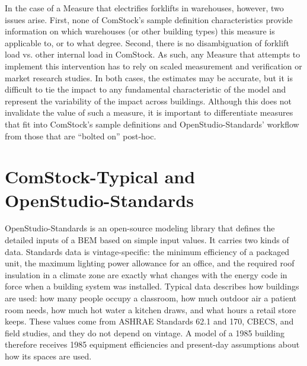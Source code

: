 In the case of a Measure that electrifies forklifts in warehouses, however, two issues arise. First, none of ComStock's sample definition characteristics provide information on which warehouses (or other building types) this measure is applicable to, or to what degree. Second, there is no disambiguation of forklift load vs. other internal load in ComStock. As such, any Measure that attempts to implement this intervention has to rely on scaled measurement and verification or market research studies. In both cases, the estimates may be accurate, but it is difficult to tie the impact to any fundamental characteristic of the model and represent the variability of the impact across buildings. Although this does not invalidate the value of such a measure, it is important to differentiate measures that fit into ComStock's sample definitions and OpenStudio-Standards' workflow from those that are ``bolted on'' post-hoc.

\section{ComStock-Typical and OpenStudio-Standards}
\label{sec:openstudio_standards}

OpenStudio-Standards is an open-source modeling library that defines the detailed inputs of a BEM based on simple input values. It carries two kinds of data. Standards data is vintage-specific: the minimum efficiency of a packaged unit, the maximum lighting power allowance for an office, and the required roof insulation in a climate zone are exactly what changes with the energy code in force when a building system was installed. Typical data describes how buildings are used: how many people occupy a classroom, how much outdoor air a patient room needs, how much hot water a kitchen draws, and what hours a retail store keeps. These values come from ASHRAE Standards 62.1 and 170, CBECS, and field studies, and they do not depend on vintage. A model of a 1985 building therefore receives 1985 equipment efficiencies and present-day assumptions about how its spaces are used.

